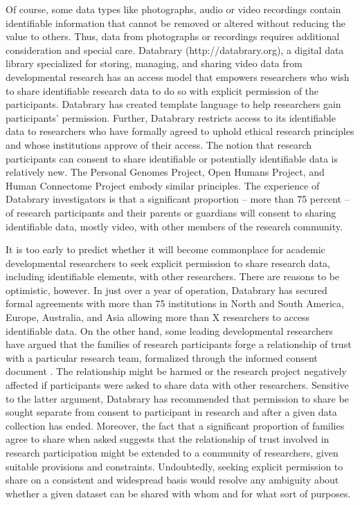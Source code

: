 \documentclass[letterpaper,man,apacite]{apa6}
\begin{document}
Of course, some data types like photographs, audio or video recordings contain identifiable information that cannot be removed or altered without reducing the value to others.
Thus, data from photographs or recordings requires additional consideration and special care.
Databrary (http://databrary.org), a digital data library specialized for storing, managing, and sharing video data from developmental research has an access model that empowers researchers who wish to share identifiable research data to do so with explicit permission of the participants.
Databrary has created template language to help researchers gain participants' permission.
Further, Databrary restricts access to its identifiable data to researchers who have formally agreed to uphold ethical research principles and whose institutions approve of their access.
The notion that research participants can consent to share identifiable or potentially identifiable data is relatively new.
The Personal Genomes Project, Open Humans Project, and Human Connectome Project embody similar principles.
The experience of Databrary investigators is that a significant proportion -- more than 75 percent -- of research participants and their parents or guardians will consent to sharing identifiable data, mostly video, with other members of the research community.

It is too early to predict whether it will become commonplace for academic developmental researchers to seek explicit permission to share research data, including identifiable elements, with other researchers.
There are reasons to be optimistic, however.
In just over a year of operation, Databrary has secured formal agreements with more than 75 institutions in North and South America, Europe, Australia, and Asia allowing more than X researchers to access identifiable data.
On the other hand, some leading developmental researchers have argued that the families of research participants forge a relationship of trust with a particular research team, formalized through the informed consent document \cite{Eisenberg-APS}.
The relationship might be harmed or the research project negatively affected if participants were asked to share data with other researchers.
Sensitive to the latter argument, Databrary has recommended that permission to share be sought separate from consent to participant in research and after a given data collection has ended.
Moreover, the fact that a significant proportion of families agree to share when asked suggests that the relationship of trust involved in research participation might be extended to a community of researchers, given suitable provisions and constraints.
Undoubtedly, seeking explicit permission to share on a consistent and widespread basis would resolve any ambiguity about whether a given dataset can be shared with whom and for what sort of purposes.
\end{document}
